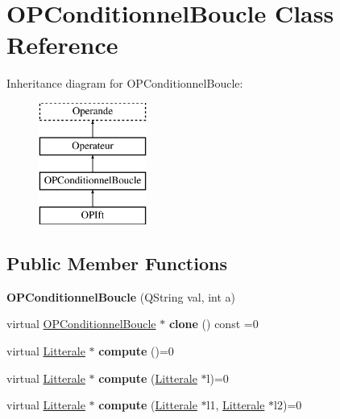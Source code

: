 \hypertarget{class_o_p_conditionnel_boucle}{}\section{O\+P\+Conditionnel\+Boucle Class Reference}
\label{class_o_p_conditionnel_boucle}
Inheritance diagram for O\+P\+Conditionnel\+Boucle\+:\begin{figure}[H]
\begin{center}
\leavevmode
\includegraphics[height=4.000000cm]{class_o_p_conditionnel_boucle}
\end{center}
\end{figure}
\subsection*{Public Member Functions}
\begin{DoxyCompactItemize}
\item 
{\bfseries O\+P\+Conditionnel\+Boucle} (Q\+String val, int a)\hypertarget{class_o_p_conditionnel_boucle_aa69b34551b9448eab78a963d83c49df2}{}\label{class_o_p_conditionnel_boucle_aa69b34551b9448eab78a963d83c49df2}

\item 
virtual \hyperlink{class_o_p_conditionnel_boucle}{O\+P\+Conditionnel\+Boucle} $\ast$ {\bfseries clone} () const  =0\hypertarget{class_o_p_conditionnel_boucle_a1226ae17a78455d33c39f95e237ba9fe}{}\label{class_o_p_conditionnel_boucle_a1226ae17a78455d33c39f95e237ba9fe}

\item 
virtual \hyperlink{class_litterale}{Litterale} $\ast$ {\bfseries compute} ()=0\hypertarget{class_o_p_conditionnel_boucle_accae5fd1c376bbe40b52cbedfada5520}{}\label{class_o_p_conditionnel_boucle_accae5fd1c376bbe40b52cbedfada5520}

\item 
virtual \hyperlink{class_litterale}{Litterale} $\ast$ {\bfseries compute} (\hyperlink{class_litterale}{Litterale} $\ast$l)=0\hypertarget{class_o_p_conditionnel_boucle_a75c635c5356c47c0febdb85eef26e4da}{}\label{class_o_p_conditionnel_boucle_a75c635c5356c47c0febdb85eef26e4da}

\item 
virtual \hyperlink{class_litterale}{Litterale} $\ast$ {\bfseries compute} (\hyperlink{class_litterale}{Litterale} $\ast$l1, \hyperlink{class_litterale}{Litterale} $\ast$l2)=0\hypertarget{class_o_p_conditionnel_boucle_a3eb3f1c30233f5ced899ad44ad85374c}{}\label{class_o_p_conditionnel_boucle_a3eb3f1c30233f5ced899ad44ad85374c}

\end{DoxyCompactItemize}
